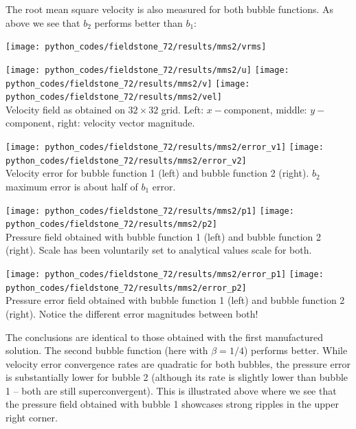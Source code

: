 The root mean square velocity is also measured for both bubble functions.
As above we see that $b_2$ performs better than $b_1$:
\begin{center}
\texttt{[image: python\_codes/fieldstone\_72/results/mms2/vrms]}
\end{center}


\begin{center}
\texttt{[image: python\_codes/fieldstone\_72/results/mms2/u]}
\texttt{[image: python\_codes/fieldstone\_72/results/mms2/v]}
\texttt{[image: python\_codes/fieldstone\_72/results/mms2/vel]}\\
{\captionfont Velocity field as obtained on $32\times 32$ grid. Left: $x-$component,
middle: $y-$component, right: velocity vector magnitude.}
\end{center}

\begin{center}
\texttt{[image: python\_codes/fieldstone\_72/results/mms2/error\_v1]}
\texttt{[image: python\_codes/fieldstone\_72/results/mms2/error\_v2]}\\
{\captionfont Velocity error for bubble function 1 (left) and bubble function 2 (right). 
$b_2$ maximum error is about half of $b_1$ error.}
\end{center}

\begin{center}
\texttt{[image: python\_codes/fieldstone\_72/results/mms2/p1]}
\texttt{[image: python\_codes/fieldstone\_72/results/mms2/p2]}\\
{\captionfont Pressure field obtained with bubble function 1 (left) and bubble function 2 (right).
Scale has been voluntarily set to analytical values scale for both.}
\end{center}

\begin{center}
\texttt{[image: python\_codes/fieldstone\_72/results/mms2/error\_p1]}
\texttt{[image: python\_codes/fieldstone\_72/results/mms2/error\_p2]}\\
{\captionfont Pressure error field obtained with bubble function 1 (left) and bubble function 2 (right). Notice the 
different error magnitudes between both!}
\end{center}

The conclusions are identical to those obtained with the first manufactured solution. 
The second bubble function (here with $\beta=1/4$) performs better. While velocity error
convergence rates are quadratic for both bubbles, the pressure error is substantially lower
for bubble 2 (although its rate is slightly lower than bubble 1 -- both are still 
superconvergent). This is illustrated above where we see that the pressure field obtained 
with bubble 1 showcases strong ripples in the upper right corner.     



